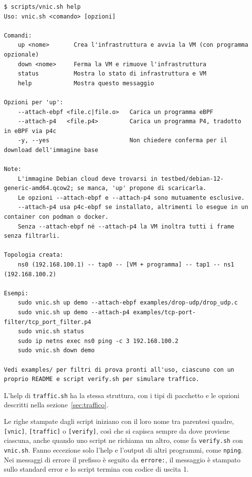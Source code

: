\noindent\begin{minipage}{\linewidth}
\begin{lstlisting}[style=terminale, caption={Output di \texttt{vnic.sh help}}, label={lst:help}]
$ scripts/vnic.sh help
Uso: vnic.sh <comando> [opzioni]

Comandi:
    up <nome>       Crea l'infrastruttura e avvia la VM (con programma opzionale)
    down <nome>     Ferma la VM e rimuove l'infrastruttura
    status          Mostra lo stato di infrastruttura e VM
    help            Mostra questo messaggio

Opzioni per 'up':
    --attach-ebpf <file.c|file.o>   Carica un programma eBPF
    --attach-p4   <file.p4>         Carica un programma P4, tradotto in eBPF via p4c
    -y, --yes                       Non chiedere conferma per il download dell'immagine base

Note:
    L'immagine Debian cloud deve trovarsi in testbed/debian-12-generic-amd64.qcow2; se manca, 'up' propone di scaricarla.
    Le opzioni --attach-ebpf e --attach-p4 sono mutuamente esclusive.
    --attach-p4 usa p4c-ebpf se installato, altrimenti lo esegue in un container con podman o docker.
    Senza --attach-ebpf né --attach-p4 la VM inoltra tutti i frame senza filtrarli.

Topologia creata:
    ns0 (192.168.100.1) -- tap0 -- [VM + programma] -- tap1 -- ns1 (192.168.100.2)

Esempi:
    sudo vnic.sh up demo --attach-ebpf examples/drop-udp/drop_udp.c
    sudo vnic.sh up demo --attach-p4 examples/tcp-port-filter/tcp_port_filter.p4
    sudo vnic.sh status
    sudo ip netns exec ns0 ping -c 3 192.168.100.2
    sudo vnic.sh down demo

Vedi examples/ per filtri di prova pronti all'uso, ciascuno con un proprio README e script verify.sh per simulare traffico.
\end{lstlisting}
\end{minipage}

L'help di \texttt{traffic.sh} ha la stessa struttura, con i tipi di pacchetto e le opzioni descritti nella sezione~\ref{sec:traffico}.

Le righe stampate dagli script iniziano con il loro nome tra parentesi quadre, \texttt{[vnic]}, \texttt{[traffic]} o \texttt{[verify]}, così che si capisca sempre da dove proviene ciascuna, anche quando uno script ne richiama un altro, come fa \texttt{verify.sh} con \texttt{vnic.sh}. Fanno eccezione solo l'help e l'output di altri programmi, come \texttt{nping}. Nei messaggi di errore il prefisso è seguito da \texttt{errore:}, il messaggio è stampato sullo standard error e lo script termina con codice di uscita 1.

